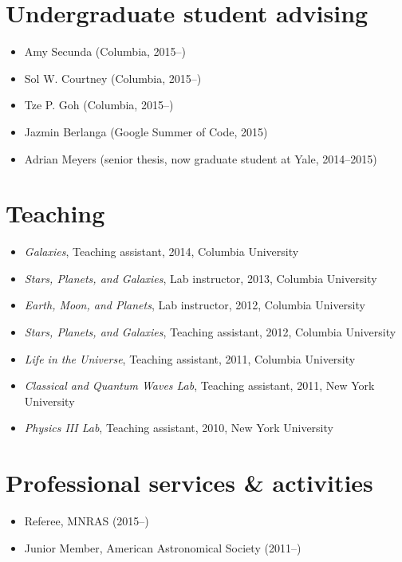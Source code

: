 \documentclass[12pt,letterpaper]{article}
\begin{document}
\section*{Undergraduate student advising}

\begin{itemize}
	\item Amy Secunda (Columbia, 2015--)
	\item Sol W. Courtney (Columbia, 2015--)
	\item Tze P. Goh (Columbia, 2015--) 
	\item Jazmin Berlanga (Google Summer of Code, 2015)
	\item Adrian Meyers (senior thesis, now graduate student at Yale, 2014--2015)
\end{itemize}

\section*{Teaching}

\begin{itemize}
	\item \emph{Galaxies}, Teaching assistant, 2014, Columbia University
	\item \emph{Stars, Planets, and Galaxies}, Lab instructor, 2013, Columbia University
	\item \emph{Earth, Moon, and Planets}, Lab instructor, 2012, Columbia University
	\item \emph{Stars, Planets, and Galaxies}, Teaching assistant, 2012, Columbia University
	\item \emph{Life in the Universe}, Teaching assistant, 2011, Columbia University
	\item \emph{Classical and Quantum Waves Lab}, Teaching assistant, 2011, New York University
	\item \emph{Physics III Lab}, Teaching assistant, 2010, New York University
\end{itemize}

\section*{Professional services \& activities}

\begin{itemize}
	\item Referee, MNRAS (2015--)
	\item Junior Member, American Astronomical Society (2011--)
\end{itemize}
\end{document}

